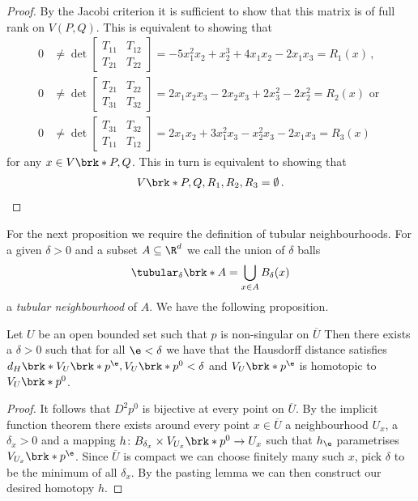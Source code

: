 \begin{proof}
  By the Jacobi criterion it is sufficient to show that this matrix is
  of full rank on $V(P,Q)$.
  This is equivalent to showing that
  \begin{align}
    0&\neq \det\begin{bmatrix}
      T_{11}&T_{12}\\T_{21}&T_{22}
    \end{bmatrix}
    =-5x_1^2x_2+x_2^3+4x_1x_2-2x_1x_3
    =R_1(x)\,, \\
    0&\neq \det\begin{bmatrix}
      T_{21}&T_{22}\\T_{31}&T_{32}
    \end{bmatrix}
    =2x_1x_2x_3-2x_2x_3+2x_3^2-2x_2^2
    =R_2(x)\text{ or } \\
    0&\neq \det\begin{bmatrix}
      T_{31}&T_{32}\\T_{11}&T_{12}
    \end{bmatrix}
    =2x_1x_2+3x_1^2x_3-x_2^2x_3-2x_1x_3
    =R_3(x)
  \end{align}
  for any $x\in V\brk*{P,Q}$. This in turn is equivalent to showing that
  \begin{align}
    V\brk*{P,Q,R_1,R_2,R_3}=\emptyset\,.
  \end{align}
\end{proof}

For the next proposition we require the definition of tubular neighbourhoods.
For a given $\delta>0$ and a subset $A\subseteq\R^d$ we call the union of $\delta$ balls
\begin{align}
  \tubular_\delta\brk*{A}=\bigcup_{x\in A}B_\delta(x)
\end{align}
a \emph{tubular neighbourhood} of $A$.
We have the following proposition.
\begin{proposition}
  Let $U$ be an open bounded set such that $p$ is non-singular on $\overline{U}$
  Then there exists a $\delta>0$ such that for all $\e<\delta$
  we have that the Hausdorff distance satisfies 
  $d_H\brk*{V_U\brk*{p^\e},V_U\brk*{p^0}}<\delta$ and 
  $V_U\brk*{p^\e}$ is homotopic to $V_U\brk*{p^0}$.
\end{proposition}
\begin{proof}
  It follows that $D^2p^0$ is bijective at every point on $\overline{U}$.
  By the implicit function theorem there exists around every point $x\in\overline{U}$
  a neighbourhood $U_x$, a $\delta_x>0$ and 
  a mapping $h\colon B_{\delta_x}\times V_{U_x}\brk*{p^0}\to U_x$ such that $h_\e$ parametrises
  $V_{U_x}\brk*{p^\e}$. Since $\overline{U}$ is compact we can choose finitely many such $x$,
  pick $\delta$ to be the minimum of all $\delta_x$. By the pasting lemma we can then construct
  our desired homotopy $h$.
\end{proof}

